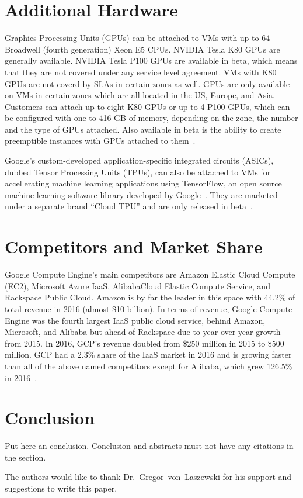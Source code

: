 \section{Additional Hardware}

Graphics Processing Units (GPUs) can be attached to VMs with up to 64
Broadwell (fourth generation) Xeon E5 CPUs. NVIDIA Tesla K80 GPUs are
generally available. NVIDIA Tesla P100 GPUs are available in beta,
which means that they are not covered under any service level
agreement. VMs with K80 GPUs are not coverd by SLAs in certain zones
as well. GPUs are only available on VMs in certain zones which are all
located in the US, Europe, and Asia. Customers can attach up to eight
K80 GPUs or up to 4 P100 GPUs, which can be configured with one to 416
GB of memory, depending on the zone, the number and the type of GPUs
attached. Also available in beta is the ability to create preemptible
instances with GPUs attached to them~\cite{hid-sp18-419-gce-gpus}.

Google's custom-developed application-specific integrated circuits
(ASICs), dubbed Tensor Processing Units (TPUs), can also be attached
to VMs for accellerating machine learning applications using
TensorFlow, an open source machine learning software library developed
by Google~\cite{hid-sp18-419-tensorflow}. They are marketed under a
separate brand ``Cloud TPU'' and are only released in
beta~\cite{hid-sp18-419-cloud-tpu}.

\section{Competitors and Market Share}

Google Compute Engine's main competitors are Amazon Elastic Cloud
Compute (EC2), Microsoft Azure IaaS, AlibabaCloud Elastic Compute
Service, and Rackspace Public Cloud. Amazon is by far the leader in
this space with 44.2\% of total revenue in 2016 (almost \$10
billion). In terms of revenue, Google Compute Engine was the fourth
largest IaaS public cloud service, behind Amazon, Microsoft, and
Alibaba but ahead of Rackspace due to year over year growth from
2015. In 2016, GCP's revenue doubled from \$250 million in 2015
to \$500 million. GCP had a 2.3\% share of the IaaS market in 2016 and
is growing faster than all of the above named competitors except for
Alibaba, which grew 126.5\% in
2016~\cite{hid-sp18-419-gartnerpr2017}.


\section{Conclusion}

Put here an conclusion. Conclusion and abstracts must not have any
citations in the section.


\begin{acks}

  The authors would like to thank Dr.~Gregor~von~Laszewski for his
  support and suggestions to write this paper.

\end{acks}


 

